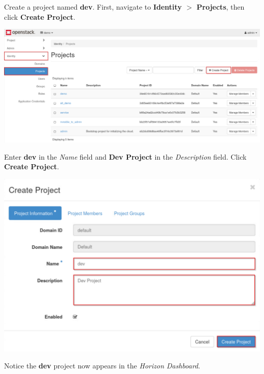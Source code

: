 \documentclass[letterpaper, 12pt]{article}
\begin{document}
\begin{enumerate}
    \begin{labstep}
        Create a project named \textbf{dev}.
        First, navigate to \textbf{Identity $>$ Projects}, then click \textbf{Create Project}.

        \begin{center}
            \includegraphics[width=\linewidth]{images/part1/step5.png}
        \end{center}
    \end{labstep}

    \begin{labstep}
        Enter \textbf{dev} in the \textit{Name} field and \textbf{Dev Project} in the \textit{Description} field.
        Click \textbf{Create Project}.

        \begin{center}
            \includegraphics[width=\linewidth]{images/part1/step6.png}
        \end{center}
    \end{labstep}

    \begin{notebox}
        Notice the \textbf{dev} project now appears in the \textit{Horizon Dashboard}.
    \end{notebox}


\end{enumerate}
\end{document}
